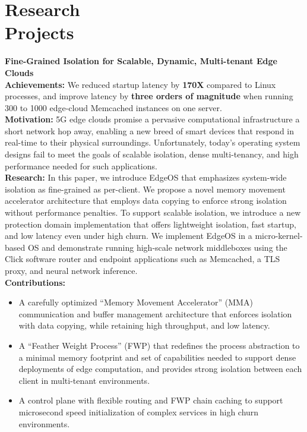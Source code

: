 \section{Research\\Projects}
\textbf{Fine-Grained Isolation for Scalable, Dynamic, Multi-tenant Edge Clouds}
\\
\textbf{\small Achievements:}
We reduced startup latency by \textbf{170X} compared to Linux processes, and improve latency by \textbf{three orders of magnitude} when running 300 to 1000 edge-cloud Memcached instances on one server.
\\
\textbf{\small Motivation:}
5G edge clouds promise a pervasive computational infrastructure a short network hop away, enabling a new breed of smart devices that respond in real-time to their physical surroundings.
Unfortunately, today’s operating system designs fail to meet the goals of scalable isolation, dense multi-tenancy, and high performance needed for such applications.
\\
\textbf{\small Research:}
In this paper, we introduce EdgeOS that emphasizes system-wide isolation as fine-grained as per-client.
We propose a novel memory movement accelerator architecture that employs data copying to enforce strong isolation without performance penalties.
To support scalable isolation, we introduce a new protection domain implementation that offers lightweight isolation, fast startup, and low latency even under high churn.
We implement EdgeOS in a micro-kernel-based OS and demonstrate running high-scale network middleboxes using the Click software router and endpoint applications such as Memcached, a TLS proxy, and neural network inference.
\\
\textbf{\small Contributions:}
\begin{itemize}[leftmargin=*]
  \setlength\itemsep{-0.0em}
        \item A carefully optimized “Memory Movement Accelerator” (MMA) communication and buffer management architecture that enforces isolation with data copying, while retaining high throughput, and low latency.
        \item A “Feather Weight Process” (FWP) that redefines the process abstraction to a minimal memory footprint and set of capabilities needed to support dense deployments of edge computation, and provides strong isolation between each client in multi-tenant environments.
        \item A control plane with flexible routing and FWP chain caching to support microsecond speed initialization of complex services in high churn environments.
\end{itemize}
